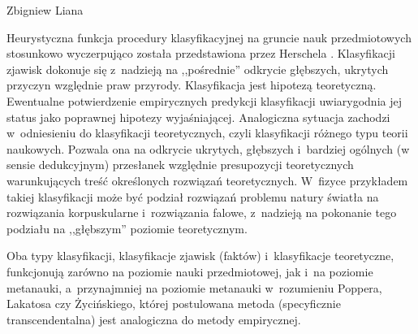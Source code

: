 \begin{artplenv}{Zbigniew Liana}
\begin{uwaga}
Heurystyczna funkcja procedury klasyfikacyjnej na gruncie nauk przedmiotowych stosunkowo wyczerpująco
została przedstawiona przez Herschela \parencite*[s.~131–139]{herschel_wstep_1955}.
Klasyfikacji zjawisk
dokonuje się z~nadzieją na ,,pośrednie'' odkrycie głębszych, ukrytych przyczyn względnie praw przyrody. Klasyfikacja jest
hipotezą teoretyczną. Ewentualne potwierdzenie empirycznych predykcji klasyfikacji uwiarygodnia jej status jako
poprawnej hipotezy wyjaśniającej. Analogiczna sytuacja zachodzi w~odniesieniu do klasyfikacji teoretycznych, czyli
klasyfikacji różnego typu teorii naukowych. Pozwala ona na odkrycie ukrytych, głębszych i~bardziej ogólnych (w sensie
dedukcyjnym) przesłanek względnie presupozycji teoretycznych warunkujących treść określonych rozwiązań
teoretycznych. W~fizyce przykładem takiej klasyfikacji może być podział rozwiązań problemu natury światła na rozwiązania
korpuskularne i~rozwiązania falowe, z~nadzieją na pokonanie tego podziału na ,,głębszym'' poziomie teoretycznym.
\end{uwaga}

Oba typy klasyfikacji, klasyfikacje zjawisk (faktów) i~klasyfikacje teoretyczne, funkcjonują zarówno na poziomie nauki
przedmiotowej, jak i~na poziomie metanauki, a~przynajmniej na poziomie metanauki w~rozumieniu Poppera, Lakatosa czy
Życińskiego, której postulowana metoda (specyficznie transcendentalna) jest analogiczna do metody empirycznej.


\end{artplenv}
